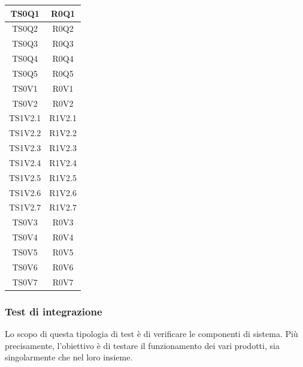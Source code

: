 \begin{longtable}{|c|c|}
    	TS0Q1&R0Q1 \\ \hline
    	TS0Q2&R0Q2 \\ \hline
    	TS0Q3&R0Q3 \\ \hline
    	TS0Q4&R0Q4 \\ \hline
    	TS0Q5&R0Q5 \\ \hline
    	
    	TS0V1&R0V1 \\ \hline
    	TS0V2&R0V2 \\ \hline
    	TS1V2.1&R1V2.1 \\ \hline
    	TS1V2.2&R1V2.2 \\ \hline
    	TS1V2.3&R1V2.3 \\ \hline
    	TS1V2.4&R1V2.4 \\ \hline
    	TS1V2.5&R1V2.5 \\ \hline
    	TS1V2.6&R1V2.6 \\ \hline
    	TS1V2.7&R1V2.7 \\ \hline
    	TS0V3&R0V3 \\ \hline
    	TS0V4&R0V4 \\ \hline
    	TS0V5&R0V5 \\ \hline
    	TS0V6&R0V6 \\ \hline
    	TS0V7&R0V7 \\ \hline
    \end{longtable}
	
	\subsubsection{Test di integrazione}
    \label{TI}
	Lo scopo di questa tipologia di test è di verificare le componenti di sistema. Più	precisamente, l’obiettivo è di testare il funzionamento dei vari  prodotti, sia singolarmente che nel loro insieme.
	
